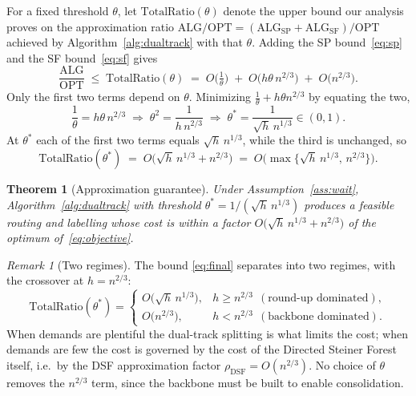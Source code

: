 \documentclass[11pt]{article}
\newtheorem{theorem}{Theorem}
\theoremstyle{definition}
\theoremstyle{remark}
\newtheorem{remark}{Remark}
\newcommand{\OPT}{\mathrm{OPT}}
\newcommand{\ALG}{\mathrm{ALG}}
\newcommand{\ALGSP}{\ALG_{\mathrm{SP}}}
\newcommand{\ALGSF}{\ALG_{\mathrm{SF}}}
\begin{document}
For a fixed threshold $\theta$, let $\mathrm{TotalRatio}(\theta)$ denote the upper bound our analysis
proves on the approximation ratio $\ALG/\OPT=(\ALGSP+\ALGSF)/\OPT$ achieved by
Algorithm~\ref{alg:dualtrack} with that $\theta$. Adding the SP bound~\eqref{eq:sp} and the SF
bound~\eqref{eq:sf} gives
\begin{equation}\label{eq:total}
  \frac{\ALG}{\OPT}\;\le\;\mathrm{TotalRatio}(\theta)
  \;=\; O\!\Big(\tfrac1\theta\Big)
  \;+\; O\!\big(h\theta\,n^{2/3}\big)
  \;+\; O\!\big(n^{2/3}\big).
\end{equation}
Only the first two terms depend on $\theta$. Minimizing $\tfrac1\theta+h\theta n^{2/3}$ by equating
the two,
\begin{equation}\label{eq:thetastar}
  \frac1\theta = h\theta\,n^{2/3}
  \;\Longrightarrow\; \theta^2=\frac{1}{h\,n^{2/3}}
  \;\Longrightarrow\; \theta^\ast=\frac{1}{\sqrt{h}\,n^{1/3}}\in(0,1).
\end{equation}
At $\theta^\ast$ each of the first two terms equals $\sqrt{h}\,n^{1/3}$, while the third is unchanged,
so
\begin{equation}\label{eq:final}
  \boxed{\;\mathrm{TotalRatio}(\theta^\ast)
  \;=\; O\!\big(\sqrt{h}\,n^{1/3}+n^{2/3}\big)
  \;=\; O\!\big(\max\{\sqrt{h}\,n^{1/3},\,n^{2/3}\}\big).\;}
\end{equation}

\begin{theorem}[Approximation guarantee]\label{thm:main}
Under Assumption~\ref{ass:wait}, Algorithm~\ref{alg:dualtrack} with threshold
$\theta^\ast=1/(\sqrt{h}\,n^{1/3})$ produces a feasible routing and labelling whose cost is within a
factor $O\!\big(\sqrt{h}\,n^{1/3}+n^{2/3}\big)$ of the optimum of~\eqref{eq:objective}.
\end{theorem}

\begin{remark}[Two regimes]
The bound \eqref{eq:final} separates into two regimes, with the crossover at $h=n^{2/3}$:
\[
  \mathrm{TotalRatio}(\theta^\ast)=
  \begin{cases}
    O\!\big(\sqrt{h}\,n^{1/3}\big), & h\ge n^{2/3}\ \ (\text{round-up dominated}),\\[4pt]
    O\!\big(n^{2/3}\big),           & h< n^{2/3}\ \ (\text{backbone dominated}).
  \end{cases}
\]
When demands are plentiful the dual-track splitting is what limits the cost; when demands are few the
cost is governed by the cost of the Directed Steiner Forest itself, i.e.\ by the DSF approximation
factor $\rho_{\mathrm{DSF}}=O(n^{2/3})$. No choice of $\theta$ removes the $n^{2/3}$ term, since the
backbone must be built to enable consolidation.
\end{remark}
\end{document}
